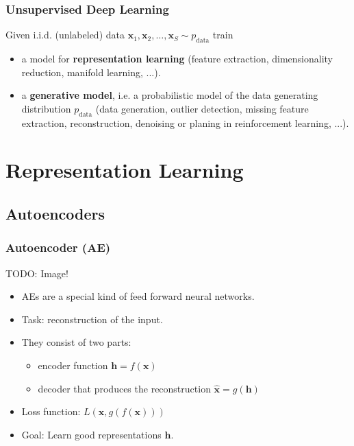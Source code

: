 \documentclass[11pt,mathserif]{beamer}
\renewcommand{\vec}[1]{{\boldsymbol{ #1}}}
\begin{document}
\begin{frame}[fragile]
\frametitle{Unsupervised Deep Learning}
Given i.i.d. (unlabeled) data $\vec x_1, \vec x_2,\dots, \vec x_S \sim  p_{\text{data}}$  train 

 \begin{itemize}
 
 \item  a model for \textbf{representation learning} (feature extraction, dimensionality reduction, manifold learning, ...).

 \pause
 
  \item a \textbf{generative model}, i.e. a probabilistic model of the  data generating distribution  $p_{\text{data}}$ 
  (data generation, outlier detection, missing feature extraction, reconstruction, denoising or planing in reinforcement learning, ...). 
  
  
 \end{itemize}


\end{frame} 

\section{Representation Learning}

\subsection{Autoencoders}


\begin{frame}
  \frametitle{Autoencoder (AE)}
  
TODO: Image!   
  
  \begin{itemize}
  \item AEs are a special kind of feed forward neural networks.
  \item  Task: reconstruction of  the input.     
  \item They consist of two parts:
  \begin{itemize}
            \item encoder function $\vec{h} = f(\vec{x})$
            \item decoder that produces the reconstruction $\hat{\vec{x}} = g(\vec{h})$
  \end{itemize}
    \item Loss function: $L\left(\vec{x}, g(f(\vec{x}))\right)$
    \item Goal: Learn good representations $\vec h$.
  \end{itemize}
  
  \end{frame}
  
\end{document}
